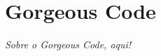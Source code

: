 \thispagestyle{empty}
\chapter{Gorgeous Code}\label{chap:gorgeous_code}


{\it 
  Sobre o Gorgeous Code, aqui!
}